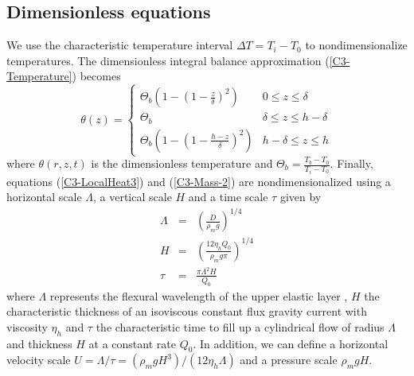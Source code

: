 \subsection{Dimensionless equations}
\label{C3-sec:dimens-equat}

We use the characteristic temperature interval $\Delta T = T_i-T_0$ to
nondimensionalize  temperatures.  The  dimensionless integral  balance
approximation (\ref{C3-Temperature}) becomes
\begin{equation}
  \theta(z)=
  \begin{cases}
    \Theta_b\left(1 -(1-\frac{z}{\delta})^2\right)& 0 \le z\le \delta \\
    \Theta_b & \delta \le z\le h-\delta \\
    \Theta_b\left(1-(1-\frac{h-z}{\delta})^2\right)  &   h-\delta  \le
    z\le h
  \end{cases}
  \label{C3-Temperature2}
\end{equation}
where   $\theta(r,z,t)$   is   the   dimensionless   temperature   and
$\Theta_b=\frac{T_b-T_0}{T_{i}-T_0}$.         Finally,       equations
(\ref{C3-LocalHeat3})  and  (\ref{C3-Mass-2})  are  nondimensionalized
using a  horizontal scale $\Lambda$, a  vertical scale $H$ and  a time
scale $\tau$ given by
\begin{eqnarray}
  \Lambda &=& \left(\frac{D}{\rho_m g}\right)^{1/4}\label{C3-L1}\\
  H&=&\left       (\frac{12\eta_h      Q_{0}}{\rho_{m}g       \pi}\right      )
       ^{1/4} \label{C3-H1}\\
  \tau&=&\frac{\pi \Lambda^{2} H}{Q_{0}}\label{C3-T1}
\end{eqnarray}
where  $\Lambda$  represents  the  flexural wavelength  of  the  upper
elastic layer \citep{Michaut:2011kg}, $H$ the characteristic thickness
of an isoviscous constant flux gravity current with viscosity $\eta_h$
\citep{Huppert:1982wr} and $\tau$ the characteristic time to fill up a
cylindrical flow of  radius $\Lambda$ and thickness $H$  at a constant
rate $Q_0$.   In addition, we  can define a horizontal  velocity scale
$U=\Lambda/\tau=\left(\rho_m           g           H^3\right)/\left(12
  \eta_h\Lambda\right)$ and a pressure scale $\rho_m g H$.

